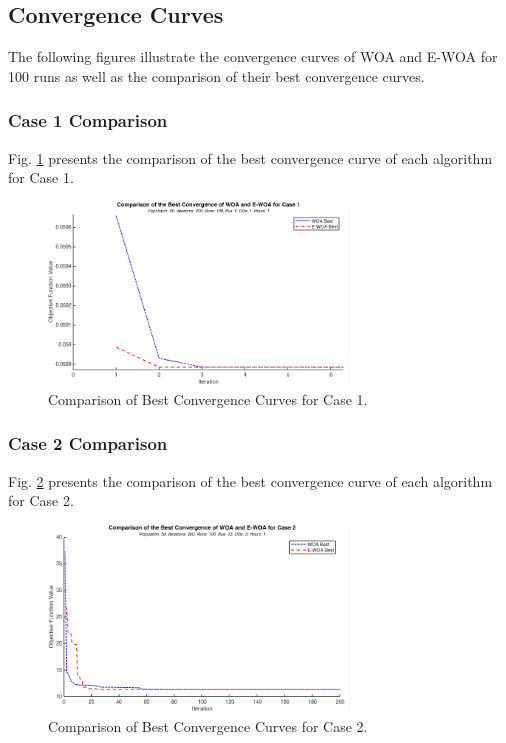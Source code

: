 \documentclass[12pt]{article}
\begin{document}
	\subsection{Convergence Curves}
	The following figures illustrate the convergence curves of WOA and E-WOA for 100 runs as well as the comparison of their best convergence curves.
	
	
	\subsubsection{Case 1 Comparison}
	
	Fig. \ref{fig:case1convcomp} presents the comparison of the best convergence curve of each algorithm for Case 1.
	
	\begin{figure}[htbp]
		\centerline{\includegraphics[width=0.7\textwidth]{case1comp.png}}
		\caption{Comparison of Best Convergence Curves for Case 1.}
		\label{fig:case1convcomp}
	\end{figure}
	
	\subsubsection{Case 2 Comparison}
	
	Fig. \ref{fig:case2convcomp} presents the comparison of the best convergence curve of each algorithm for Case 2.
	
	\begin{figure}[htbp]
		\centerline{\includegraphics[width=0.7\textwidth]{case2comp.png}}
		\caption{Comparison of Best Convergence Curves for Case 2.}
		\label{fig:case2convcomp}
	\end{figure}
	
\end{document}
